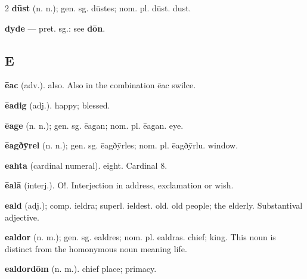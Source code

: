 \begin{multicols*}{2}
\textbf{dūst} (n. n.); gen. sg. dūstes; nom. pl. dūst. dust.\par
\textbf{dyde} — pret. sg.: see \textbf{dōn}.\par
\subsection*{E}
\textbf{ēac} (adv.). also. Also in the combination ēac swilce.\par
\textbf{ēadig} (adj.). happy; blessed.\par
\textbf{ēage} (n. n.); gen. sg. ēagan; nom. pl. ēagan. eye.\par
\textbf{ēagðȳrel} (n. n.); gen. sg. ēagðȳrles; nom. pl. ēagðȳrlu. window.\par
\textbf{eahta} (cardinal numeral). eight. Cardinal 8.\par
\textbf{ēalā} (interj.). O!. Interjection in address, exclamation or wish.\par
\textbf{eald} (adj.); comp. ieldra; superl. ieldest. old. old people; the elderly. Substantival adjective.\par
\textbf{ealdor} (n. m.); gen. sg. ealdres; nom. pl. ealdras. chief; king. This noun is distinct from the homonymous noun meaning life.\par
\textbf{ealdordōm} (n. m.). chief place; primacy.\par

\end{multicols*}
